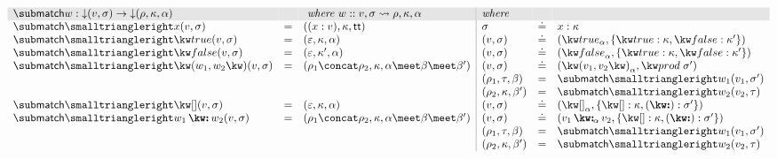 $\begin{array}{lll|lll}
   \arrayrulecolor{lightgray}
   \rowcolor{verylightgray}
   \matchFwdGC{w}: \Below{(v,\sigma)} \to \Below{(\rho,\kappa, \alpha)}
   &&\textit{ where }w :: v, \sigma \match \rho, \kappa, \alpha
   &\textit{where}&&
   \\
   \matchFwdF{x}(v, \sigma)
   &=&
   (\bind{x}{v}, \kappa, \TT)
   &
   \sigma &\eq& \elimVar{x}{\kappa}
   \\
   \matchFwdF{\matchTrue}(v, \sigma)
   &=&
   (\seqEmpty, \kappa, \alpha)
   &
   (v, \sigma) &\eq& (\annTrue{\alpha}, \elimBool{\kappa}{\kappa'})
   \\
   \matchFwdF{\matchFalse}(v, \sigma)
   &=&
   (\seqEmpty, \kappa', \alpha)
   &
   (v, \sigma) &\eq& (\annFalse{\alpha}, \elimBool{\kappa}{\kappa'})
   \\
   \matchFwdF{\matchPair{w_1}{w_2}}(v, \sigma)
   &=&
   (\rho_1 \concat \rho_2, \kappa, \alpha \meet \beta \meet \beta')
   &
   (v, \sigma) &\eq& (\annPair{v_1}{v_2}{\alpha}, \elimProd{\sigma'})
   \\
   &&&
   (\rho_1, \tau, \beta) &=& \matchFwdF{w_1}(v_1,\sigma')
   \\
   &&&
   (\rho_2, \kappa, \beta') &=& \matchFwdF{w_2}(v_2,\tau)
   \\
   \matchFwdF{\matchNil}(v, \sigma)
   &=&
   (\seqEmpty, \kappa, \alpha)
   &
   (v, \sigma) &\eq& (\annNil{\alpha}, \elimList{\kappa}{\sigma'})
   \\
   \matchFwdF{\matchCons{w_1}{w_2}}(v, \sigma)
   &=&
   (\rho_1 \concat \rho_2, \kappa, \alpha \meet \beta \meet \beta')
   &
   (v, \sigma) &\eq& (\annCons{v_1}{v_2}{\alpha}, \elimList{\kappa}{\sigma'})
   \\
   &&&
   (\rho_1, \tau, \beta) &=& \matchFwdF{w_1}(v_1,\sigma')
   \\
   &&&
   (\rho_2, \kappa, \beta') &=& \matchFwdF{w_2}(v_2,\tau)
\end{array}$\\
